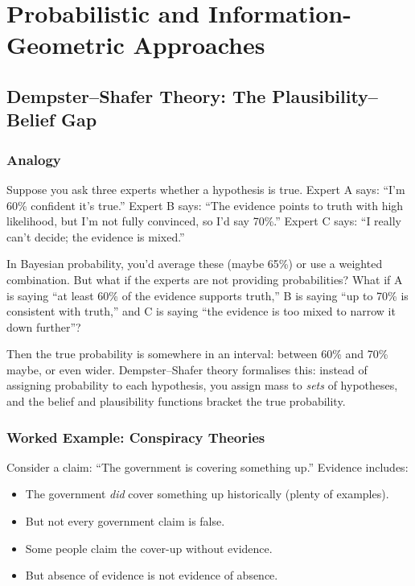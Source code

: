 \documentclass[11pt,letterpaper]{article}
\theoremstyle{definition}
\theoremstyle{remark}
\begin{document}
\newpage

\section{Probabilistic and Information-Geometric Approaches}
\label{sec:probabilistic}

\subsection{Dempster--Shafer Theory: The Plausibility--Belief Gap}
\label{sec:ds}

\subsubsection*{Analogy}

Suppose you ask three experts whether a hypothesis is true. Expert A says: ``I'm 60\% confident it's true.'' Expert B says: ``The evidence points to truth with high likelihood, but I'm not fully convinced, so I'd say 70\%.'' Expert C says: ``I really can't decide; the evidence is mixed.''

In Bayesian probability, you'd average these (maybe 65\%) or use a weighted combination. But what if the experts are not providing probabilities? What if A is saying ``at least 60\% of the evidence supports truth,'' B is saying ``up to 70\% is consistent with truth,'' and C is saying ``the evidence is too mixed to narrow it down further''?

Then the true probability is somewhere in an interval: between 60\% and 70\% maybe, or even wider. Dempster--Shafer theory formalises this: instead of assigning probability to each hypothesis, you assign mass to \emph{sets} of hypotheses, and the belief and plausibility functions bracket the true probability.

\subsubsection*{Worked Example: Conspiracy Theories}

Consider a claim: ``The government is covering something up.'' Evidence includes:
\begin{itemize}
\item The government \emph{did} cover something up historically (plenty of examples).
\item But not every government claim is false.
\item Some people claim the cover-up without evidence.
\item But absence of evidence is not evidence of absence.
\end{itemize}
\end{document}
